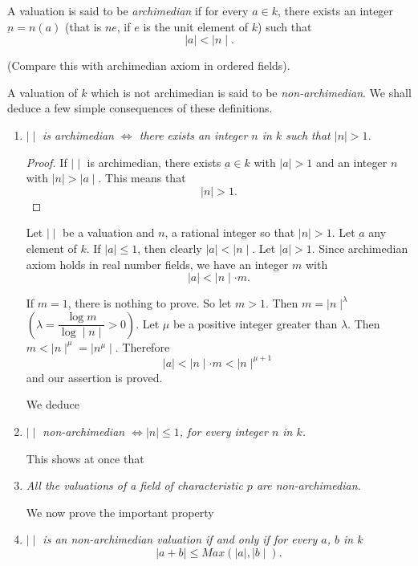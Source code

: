  A valuation is  said to be \textit{archimedian} if  for every $
 a \in k $, there exists an integer $ \underbar{n} = n (a) $
(that is $ne$, if $e$  is the unit  element of $k$) such that 
 $$
 \mid a \mid < \mid n \mid .
 $$

 (Compare this with archimedian axiom in ordered  fields).

 
 A valuation of $k$ which is not archimedian is said to be
\textit{non-archi\-median}. We shall deduce a few simple consequences of
these definitions. 
  \begin{enumerate}[1)]
\item $ \mid \mid $ \textit{is archimedian $ \Longleftrightarrow$
  there exists an integer $n$ in $k$ such that $\mid n \mid  > 1$.} 

 \begin{proof}
If $ \mid \mid $ is archimedian, there exists  $ \underbar{a} \in k $
with $ \mid a \mid > 1 $ and an integer $n$ with  $ \mid n \mid > \mid
a \mid $. This means that  
$$
 \mid n \mid > 1.
$$
 \end{proof} 
 
 Let $ \mid \mid $  be a valuation and $n$, a rational integer so
 that $ \mid n \mid > 1$. Let $\underbar{a}$ any element of $k$. If
 $\mid a \mid \leq 1$, then clearly $ \mid a \mid < |n \mid $. Let $
 \mid a \mid > 1 $. Since archimedian axiom holds in real number
 fields, we have an integer $m$ with 
 $$
 \mid a \mid < \mid n \mid \cdot m . 
 $$\pageoriginale
 
 If $ m = 1 $, there is nothing  to prove. So let $m > 1 $. Then $ m
 = \mid n \mid^\lambda$  $( \lambda = \dfrac{\log m }{\log \mid n
   \mid } > 0)$. Let $\mu$ be a positive integer greater than $\lambda$.  
 Then $ m < \mid n \mid^\mu = \mid n^\mu \mid $.  Therefore
 $$
 \mid a \mid < \mid n \mid \cdot  m < \mid n  \mid^{\mu +1}
 $$ 
 and our assertion is proved.
 
 We deduce 

 \item \textit{$\mid \mid$ non-archimedian $\Longleftrightarrow
   \mid n \mid \leq 1$, for every integer  $n$ in $k$.} 

This shows at once that 

\item \textit{All the valuations of a field of characteristic $p$ are
  non-archimedian.} 

We now prove the  important property

\item \textit{$\mid \mid$ is an non-archimedian valuation if and
  only if for every $a$, $b$ in $k$} 
$$
 \mid a + b \mid \leq Max ( \mid a \mid , \mid b \mid ) .
$$


\end{enumerate}
